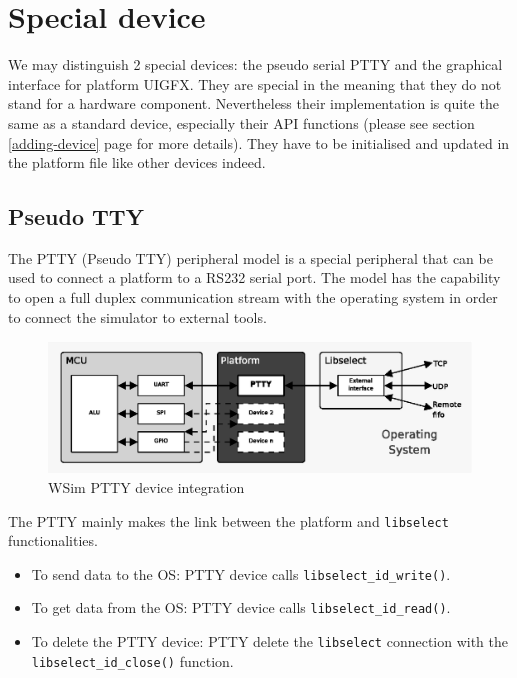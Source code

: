 \documentclass[a4paper,10pt]{report}
\begin{document}
\section{Special device}

We may distinguish 2 special devices: the pseudo serial PTTY and the graphical interface for platform UIGFX. They are special in the meaning that they do not stand for a hardware component. Nevertheless their implementation is quite the same as a standard device, especially their API functions (please see section \ref{adding-device} page \pageref{adding-device} for more details). They have to be initialised and updated in the platform file like other devices indeed.

\subsection{Pseudo TTY}
\label{PTTY}
The PTTY (Pseudo TTY) peripheral model is a special peripheral that can be used to connect a platform to a RS232 serial port. The model has the capability to open a full duplex communication stream with the operating system in order to connect the simulator to external tools.

\begin{figure}[!h]
\begin{center}
  \includegraphics[scale=1]{figures/wsim_ptty.eps}
\end{center}
\caption{WSim PTTY device integration}
\label{wsim-ptty}
\end{figure}

The PTTY mainly makes the link between the platform and \verb$libselect$ functionalities.
\begin{itemize}
  \item To send data to the OS: PTTY device calls \verb$libselect_id_write()$.
  \item To get data from the OS: PTTY device calls \verb$libselect_id_read()$.
  \item To delete the PTTY device: PTTY delete the \verb$libselect$ connection with the \verb$libselect_id_close()$ function.
\end{itemize}
\end{document}
